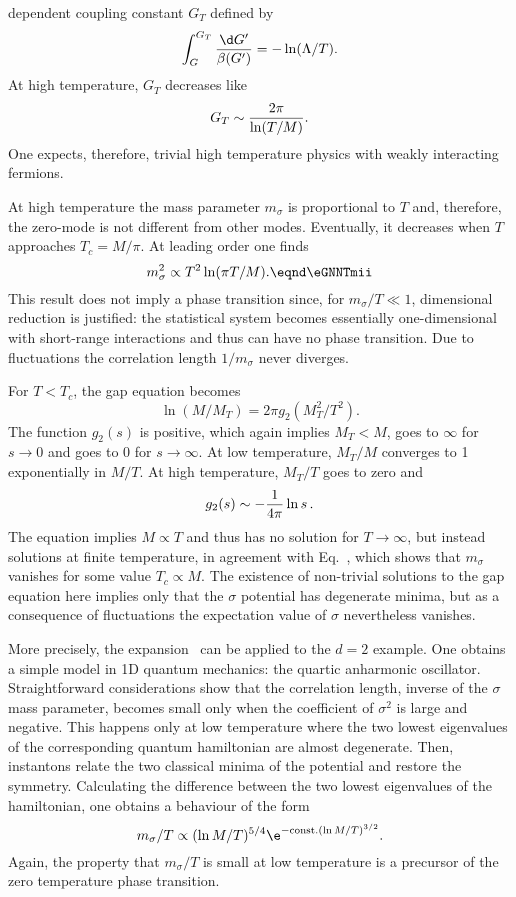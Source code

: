 dependent coupling constant $G_T$ defined by
$$\int_G^{G_T}{\d G'\over \beta(G')}=-\ln( \Lambda/T ).$$
At high temperature, $G_T$ decreases like
$$G_T  \sim {2\pi \over \ln( T/M)}.$$
One expects,  therefore, trivial high temperature physics with weakly interacting fermions.  \par
At high temperature  the mass parameter $m_\sigma $ is proportional to $T$
and, therefore, the zero-mode is not different from other modes. Eventually, it decreases
when $T$ approaches $T_c=M/\pi$. At leading order one finds
$$m_\sigma ^2\propto T^2 \ln(\pi T/M)  .\eqnd\eGNNTmii $$
This  result does not imply a phase transition since, for  $m_ \sigma /T\ll1 $, dimensional reduction is justified: the statistical system becomes essentially  one-dimensional  with short-range interactions and thus can have no phase transition. Due to fluctuations the correlation length $1/m_\sigma $ never diverges. \par
For $T<T_c$, the gap equation becomes
$$\ln(M/M_T)=2\pi g_2(M_T^2/T^2).$$
The function $g_2(s)$ is positive, which again implies $M_T<M$, goes to $ \infty$ for $s\to0$
and goes to $0$ for $s\to  \infty $.  At low temperature, $M_T/M$ converges to 1 exponentially in $M/T$.
At high temperature, $M_T/T$ goes to zero and
$$g_2(s)\sim -{1\over 4\pi}\ln s\,.$$
The equation implies $M\propto T$ and thus has no solution for $T\to\infty$, but instead  solutions at finite temperature, in agreement with Eq.~\eGNNTmii, which shows that $m_\sigma $ vanishes for some value $T_c\propto M$. The existence of non-trivial solutions to the gap equation here implies
only that the $\sigma $ potential has degenerate minima, but as a consequence of fluctuations
the expectation value of $\sigma $ nevertheless vanishes. \par
More precisely, the expansion \eFTGNloc\ can be applied to the $d=2$ example. One obtains a simple model in 1D quantum
mechanics: the quartic anharmonic oscillator. Straightforward considerations
show that the correlation length, inverse of the $\sigma $ mass parameter,
becomes small only when the coefficient of $\sigma^2$ is large and negative.
This happens only at low temperature where the two lowest eigenvalues of the
corresponding quantum hamiltonian are almost degenerate. Then, instantons  relate  the two classical minima of the potential and restore the symmetry.  Calculating the difference between the two lowest eigenvalues
of the  hamiltonian, one obtains a behaviour of the form
$$m_\sigma/T \propto (\ln M /T)^{5/4}\e^{-{\rm const.}(\ln M/T)^{3/2}}. $$
Again, the property that $m_\sigma /T$ is small at low temperature
is a precursor of the zero temperature phase transition.

